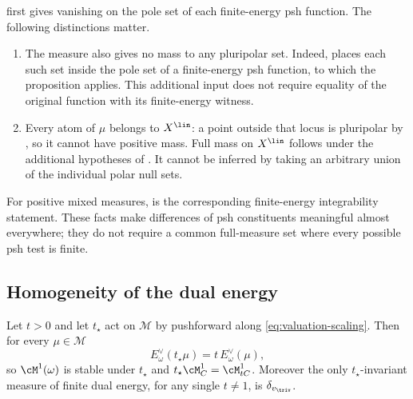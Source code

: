 \begin{remark}
\label{rem:ch47-polar-scope}
 first gives vanishing on the pole set of
each finite-energy psh function.  The following distinctions matter.
\begin{enumerate}
\item\label{itm:ch47-polar:pluripolar}
      The measure also gives no mass to any pluripolar set.
      Indeed, \cite[Corollary~7.48]{BJ22} places each such set inside
      the pole set of a finite-energy psh function, to which the
      proposition applies.  This additional input does not require
      equality of the original function with its finite-energy witness.
\item\label{itm:ch47-polar:lin}
      Every atom of $\mu$ belongs to $X^{\lin}$: a point outside that
      locus is pluripolar by , so it cannot
      have positive mass.  Full mass on $X^{\lin}$ follows under the
      additional hypotheses of .
      It cannot be inferred by taking an arbitrary union of the
      individual polar null sets.
\end{enumerate}
For positive mixed measures,  is the
corresponding finite-energy integrability statement.
These facts make differences of psh constituents meaningful almost
everywhere; they do not require a common full-measure set where
every possible psh test is finite.
\end{remark}

\subsection{Homogeneity of the dual energy}
\label{sec:ch47-dual-scaling}

\begin{proposition}
\label{prop:ch47-dual-scaling}
Let $t>0$ and let $t_\star$ act on $\mathcal M$ by pushforward along
\eqref{eq:valuation-scaling}.  Then for every $\mu\in\mathcal M$
\[
 E^\vee_\omega(t_\star\mu)=t\,E^\vee_\omega(\mu),
\tag{47.16}\label{eq:ch47-dual-scaling}
\]
so $\cM^1(\omega)$ is stable under $t_\star$ and
$t_\star\cM^1_C=\cM^1_{tC}$.  Moreover the only $t_\star$-invariant
measure of finite dual energy, for any single $t\ne1$, is
$\delta_{v_{\triv}}$.
\end{proposition}

